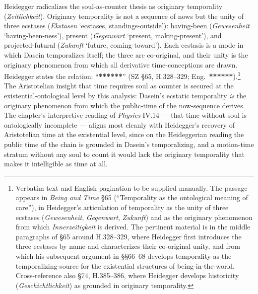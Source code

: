 Heidegger radicalizes the soul-as-counter thesis as originary temporality (\textit{Zeitlichkeit}). Originary temporality is not a sequence of nows but the unity of three ecstases (\textit{Ekstasen} `ecstases, standings-outside'): having-been (\textit{Gewesenheit} `having-been-ness'), present (\textit{Gegenwart} `present, making-present'), and projected-futural (\textit{Zukunft} `future, coming-toward'). Each ecstasis is a mode in which Dasein temporalizes itself; the three are co-original, and their unity is the originary phenomenon from which all derivative time-conceptions are drawn. Heidegger states the relation: ``\textbf{******}'' (SZ \S 65, H.328--329; Eng.~\textbf{******}).\footnote{Verbatim text and English pagination to be supplied manually. The passage appears in \textit{Being and Time} \S 65 (``Temporality as the ontological meaning of care''), in Heidegger's articulation of temporality as the unity of three ecstases (\textit{Gewesenheit}, \textit{Gegenwart}, \textit{Zukunft}) and as the originary phenomenon from which \textit{Innerzeitigkeit} is derived. The pertinent material is in the middle paragraphs of \S 65 around H.328--329, where Heidegger first introduces the three ecstases by name and characterizes their co-original unity, and from which his subsequent argument in \S\S 66--68 develops temporality as the temporalizing-source for the existential structures of being-in-the-world. Cross-reference also \S 74, H.385--386, where Heidegger develops historicity (\textit{Geschichtlichkeit}) as grounded in originary temporality.} The Aristotelian insight that time requires soul as counter is secured at the existential-ontological level by this analysis: Dasein's ecstatic temporality \textit{is} the originary phenomenon from which the public-time of the now-sequence derives. The chapter's interpretive reading of \textit{Physics} IV.14 --- that time without soul is ontologically incomplete --- aligns most cleanly with Heidegger's recovery of Aristotelian time at the existential level, since on the Heideggerian reading the public time of the chain is grounded in Dasein's temporalizing, and a motion-time stratum without any soul to count it would lack the originary temporality that makes it intelligible as time at all.

